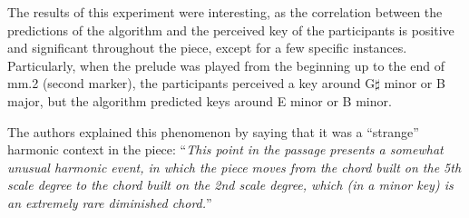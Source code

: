 The results of this experiment were interesting, as the correlation between the predictions of the algorithm and the perceived key of the participants is positive and significant throughout the piece, except for a few specific instances. Particularly, when the prelude was played from the beginning up to the end of mm.2 (second marker), the participants perceived a key around G$\sharp$ minor or B major, but the algorithm predicted keys around E minor or B minor.

The authors explained this phenomenon by saying that it was a ``strange'' harmonic context in the piece: ``\emph{This point in the passage presents a somewhat unusual harmonic event, in which the piece moves from the chord built on the 5th scale degree to the chord built on the 2nd scale degree, which (in a minor key) is an extremely rare diminished chord.}''












